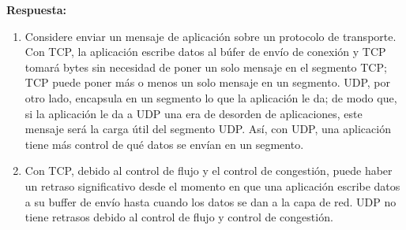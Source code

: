 \documentclass[a4paper, 11pt]{article}
\theoremstyle{definition} \theoremstyle{remark}
\begin{document}
    \textbf{Respuesta:}
    \begin{enumerate}
      \item Considere enviar un mensaje de aplicaci\'on sobre un protocolo de transporte. Con TCP, la aplicaci\'on escribe datos al b\'ufer de env\'io de conexi\'on y TCP tomar\'a bytes sin necesidad de poner un solo mensaje en el segmento TCP; TCP puede poner m\'as o menos un solo mensaje en un segmento. UDP, por otro lado, encapsula en un segmento lo que la aplicaci\'on le da; de modo que, si la aplicaci\'on le da a UDP una era de desorden de aplicaciones, este mensaje ser\'a la carga \'util del segmento UDP. As\'i, con UDP, una aplicaci\'on tiene m\'as control de qu\'e datos se env\'ian en un segmento.
      \item Con TCP, debido al control de flujo y el control de congesti\'on, puede haber un retraso significativo desde el momento en que una aplicaci\'on escribe datos a su buffer de env\'io hasta cuando los datos se dan a la capa de red. UDP no tiene retrasos debido al control de flujo y control de congesti\'on.
    \end{enumerate}
\end{document}
